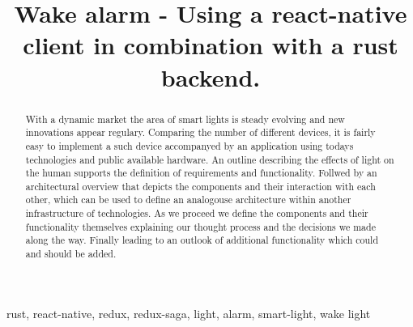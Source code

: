 \documentclass[conference]{IEEEtran}
\begin{document}
\title{Wake alarm - Using a react-native client in combination with a rust backend.}

\author{
\and
{}
}

\maketitle

\begin{abstract}
With a dynamic market the area of smart lights is steady evolving and new innovations appear regulary. Comparing the number of
different devices, it is fairly easy to implement a such device accompanyed by an application using todays technologies
and public available hardware. An outline describing the effects of light on the human supports the definition of requirements
and functionality. Follwed by an architectural overview that depicts the components and their interaction with each other, which
can be used to define an analogouse architecture within another infrastructure of technologies. As we proceed we define the
components and their functionality themselves explaining our thought process and the decisions we made along the way. 
Finally leading to an outlook of additional functionality which could and should be added.

\end{abstract}

\begin{IEEEkeywords}
rust, react-native, redux, redux-saga, light, alarm, smart-light, wake light
\end{IEEEkeywords}

\end{document}
